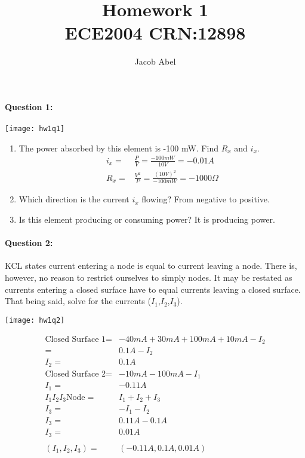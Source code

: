 \documentclass[12pt,letterpaper,titlepage]{article}
\author{Jacob Abel}
\title{	Homework 1
	\\\large ECE2004 CRN:12898
}
\begin{document}
\maketitle

\paragraph{Question 1: }

\begin{center}
\texttt{[image: hw1q1]}
\end{center}

\begin{enumerate}[label=\Alph*.]
\item The power absorbed by this element is -100 mW. Find $R_x$ and $i_x$.
\begin{align*}
i_x =& \frac{P}{V} = \frac{-100mW}{10V} = -0.01A        \\
R_x =& \frac{V^2}{P} = \frac{(10V)^2}{-100mW} = -1000 \Omega
\end{align*}
\item Which direction is the current $i_x$ flowing? From negative to positive.
\item Is this element producing or consuming power? It is producing power.
\end{enumerate}

\clearpage

\paragraph{Question 2: }

KCL states current entering a node is equal to current leaving a node. There is, however, no reason to restrict ourselves to simply nodes. It may be restated as currents entering a closed surface have to equal currents leaving a closed surface. That being said, solve for the currents ($I_1$,$I_2$,$I_3$).

\begin{center}
\texttt{[image: hw1q2]}
\end{center}

\begin{align*}
  \text{Closed Surface 1} 	=& -40mA + 30mA + 100mA + 10mA - I_2
\\							=& 0.1A - I_2
\\						I_2 =& 0.1A
\\\text{Closed Surface 2} 	=& -10mA - 100mA - I_1
\\						I_1 =& -0.11A
\\I_1I_2I_3 \text{Node} 	=& I_1 + I_2 + I_3
\\ 						I_3 =& -I_1 - I_2
\\ 						I_3 =& 0.11A - 0.1A
\\						I_3 =& 0.01A
\\
\\		    (I_1, I_2, I_3) =& (-0.11A, 0.1A, 0.01A)
\end{align*}
\end{document}
